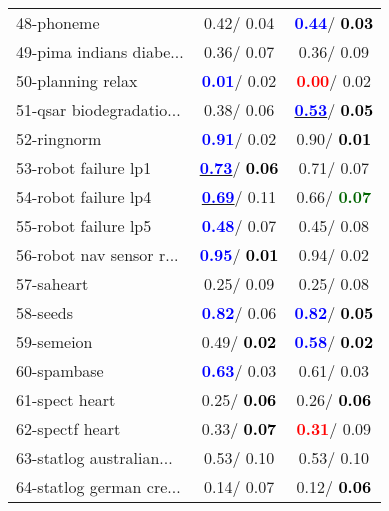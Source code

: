 \begin{table}[h]
\begin{center}
\begin{tabular}{lc|c}
48-phoneme &   0.42/  0.04 & \textcolor{blue}{\textbf{  0.44}}/\textcolor{black}{\textbf{  0.03}} \\
49-pima indians diabe... &   0.36/  0.07 &   0.36/  0.09 \\
50-planning relax & \textcolor{blue}{\textbf{  0.01}}/  0.02 & \textcolor{red}{\textbf{  0.00}}/  0.02 \\
51-qsar biodegradatio... &   0.38/  0.06 & \underline{\textcolor{blue}{\textbf{  0.53}}}/\textcolor{black}{\textbf{  0.05}} \\
52-ringnorm & \textcolor{blue}{\textbf{  0.91}}/  0.02 &   0.90/\textcolor{black}{\textbf{  0.01}} \\
53-robot failure lp1 & \underline{\textcolor{blue}{\textbf{  0.73}}}/\textcolor{black}{\textbf{  0.06}} &   0.71/  0.07 \\ \hline
54-robot failure lp4 & \underline{\textcolor{blue}{\textbf{  0.69}}}/  0.11 &   0.66/\textcolor{darkgreen}{\textbf{  0.07}} \\
55-robot failure lp5 & \textcolor{blue}{\textbf{  0.48}}/  0.07 &   0.45/  0.08 \\
56-robot nav sensor r... & \textcolor{blue}{\textbf{  0.95}}/\textcolor{black}{\textbf{  0.01}} &   0.94/  0.02 \\
57-saheart &   0.25/  0.09 &   0.25/  0.08 \\
58-seeds & \textcolor{blue}{\textbf{  0.82}}/  0.06 & \textcolor{blue}{\textbf{  0.82}}/\textcolor{black}{\textbf{  0.05}} \\
59-semeion &   0.49/\textcolor{black}{\textbf{  0.02}} & \textcolor{blue}{\textbf{  0.58}}/\textcolor{black}{\textbf{  0.02}} \\
60-spambase & \textcolor{blue}{\textbf{  0.63}}/  0.03 &   0.61/  0.03 \\ \hline
61-spect heart &   0.25/\textcolor{black}{\textbf{  0.06}} &   0.26/\textcolor{black}{\textbf{  0.06}} \\
62-spectf heart &   0.33/\textcolor{black}{\textbf{  0.07}} & \textcolor{red}{\textbf{  0.31}}/  0.09 \\
63-statlog australian... &   0.53/  0.10 &   0.53/  0.10 \\
64-statlog german cre... &   0.14/  0.07 &   0.12/\textcolor{black}{\textbf{  0.06}} \\\end{tabular}\label{stratsALCKappa1bestReduxb}
\end{center}
\end{table}
